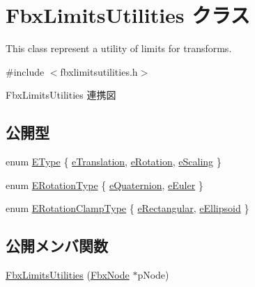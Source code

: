 \hypertarget{class_fbx_limits_utilities}{}\section{Fbx\+Limits\+Utilities クラス}
\label{class_fbx_limits_utilities}


This class represent a utility of limits for transforms.  




{\ttfamily \#include $<$fbxlimitsutilities.\+h$>$}



Fbx\+Limits\+Utilities 連携図
\subsection*{公開型}
\begin{DoxyCompactItemize}
\item 
enum \hyperlink{class_fbx_limits_utilities_aa55167751039b3d64b56cb7e58f2e62c}{E\+Type} \{ \hyperlink{class_fbx_limits_utilities_aa55167751039b3d64b56cb7e58f2e62cad5f4a235b05c5125317da39da0a500a4}{e\+Translation}, 
\hyperlink{class_fbx_limits_utilities_aa55167751039b3d64b56cb7e58f2e62caec36a0e6c35ad607d141dce69825b880}{e\+Rotation}, 
\hyperlink{class_fbx_limits_utilities_aa55167751039b3d64b56cb7e58f2e62ca1167d6156a651d47a02a5cd53fe175a8}{e\+Scaling}
 \}
\item 
enum \hyperlink{class_fbx_limits_utilities_a8c1ec432e195d91eae2548fbc98c8770}{E\+Rotation\+Type} \{ \hyperlink{class_fbx_limits_utilities_a8c1ec432e195d91eae2548fbc98c8770a23e246527e2e7002e7761b80a782d3ff}{e\+Quaternion}, 
\hyperlink{class_fbx_limits_utilities_a8c1ec432e195d91eae2548fbc98c8770a9d5b4fecb8bd1f6a68746799d8c7c8d7}{e\+Euler}
 \}
\item 
enum \hyperlink{class_fbx_limits_utilities_a6724e1b0b6ba776ecb0c66e7b0ed075d}{E\+Rotation\+Clamp\+Type} \{ \hyperlink{class_fbx_limits_utilities_a6724e1b0b6ba776ecb0c66e7b0ed075da0bca9b07722c907bfa4de6bd618f1a23}{e\+Rectangular}, 
\hyperlink{class_fbx_limits_utilities_a6724e1b0b6ba776ecb0c66e7b0ed075da03110a5bd9a356f666df030ed80d9e42}{e\+Ellipsoid}
 \}
\end{DoxyCompactItemize}
\subsection*{公開メンバ関数}
\begin{DoxyCompactItemize}
\item 
\hyperlink{class_fbx_limits_utilities_a375046bf32ce52b180249e3524ca5731}{Fbx\+Limits\+Utilities} (\hyperlink{class_fbx_node}{Fbx\+Node} $\ast$p\+Node)
\end{DoxyCompactItemize}
